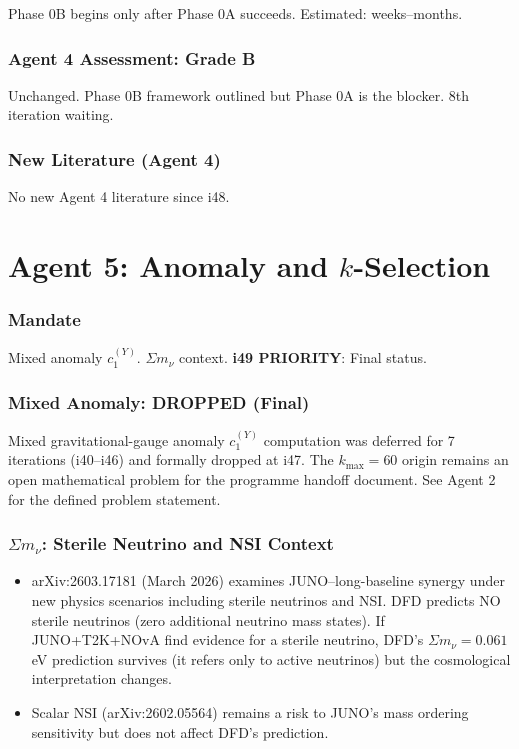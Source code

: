 \documentclass[11pt,a4paper]{article}
\begin{document}
Phase 0B begins only after Phase 0A succeeds. Estimated: weeks--months.

\section{Agent 4 Assessment: Grade B}

Unchanged. Phase 0B framework outlined but Phase 0A is the blocker. 8th iteration waiting.

\section{New Literature (Agent 4)}

No new Agent 4 literature since i48.


\part{Agent 5: Anomaly and $k$-Selection}
\label{part:agent5}

\section{Mandate}

Mixed anomaly $c_1^{(Y)}$. $\Sigma m_\nu$ context. \textbf{i49 PRIORITY}: Final status.

\section{Mixed Anomaly: DROPPED (Final)}

Mixed gravitational-gauge anomaly $c_1^{(Y)}$ computation was deferred for 7 iterations (i40--i46) and formally dropped at i47. The $k_{\max} = 60$ origin remains an open mathematical problem for the programme handoff document. See Agent 2 for the defined problem statement.

\section{$\Sigma m_\nu$: Sterile Neutrino and NSI Context}

\begin{itemize}
\item arXiv:2603.17181 (March 2026) examines JUNO--long-baseline synergy under new physics scenarios including sterile neutrinos and NSI. DFD predicts NO sterile neutrinos (zero additional neutrino mass states). If JUNO+T2K+NOvA find evidence for a sterile neutrino, DFD's $\Sigma m_\nu = 0.061$ eV prediction survives (it refers only to active neutrinos) but the cosmological interpretation changes.
\item Scalar NSI (arXiv:2602.05564) remains a risk to JUNO's mass ordering sensitivity but does not affect DFD's prediction.
\end{itemize}
\end{document}
